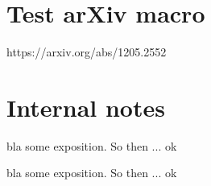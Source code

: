 \documentclass{scrartcl}
\begin{document}
\section{Test arXiv macro}
https://arxiv.org/abs/1205.2552

\section{Internal notes}

bla some exposition.  So then ...  ok

bla some exposition.  So then ...  ok
\end{document}
